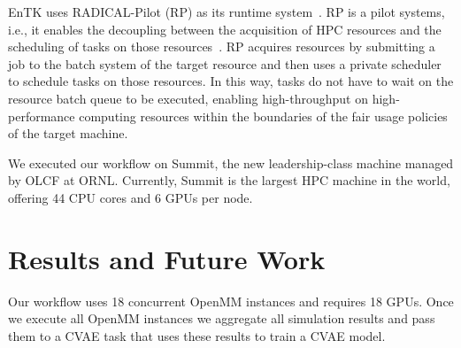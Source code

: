 \documentclass[conference,final]{IEEEtran}
\begin{document}
EnTK uses RADICAL-Pilot (RP) as its runtime system~\cite{merzky2018using}. RP
is a pilot systems, i.e., it enables the decoupling between the acquisition
of HPC resources and the scheduling of tasks on those
resources~\cite{turilli2018comprehensive}. RP acquires resources by
submitting a job to the batch system of the target resource and then uses a
private scheduler to schedule tasks on those resources. In this way, tasks do
not have to wait on the resource batch queue to be executed, enabling
high-throughput on high-performance computing resources within the boundaries
of the fair usage policies of the target machine.

We executed our workflow on Summit, the new leadership-class machine managed
by OLCF at ORNL\@. Currently, Summit is the largest HPC machine in the world,
offering 44 CPU cores and 6 GPUs per node.


\section{Results and Future Work}

Our workflow uses 18 concurrent OpenMM instances and requires 18 GPUs. Once
we execute all OpenMM instances we aggregate all simulation results and pass
them to a CVAE task that uses these results to train a CVAE model.






\end{document}
